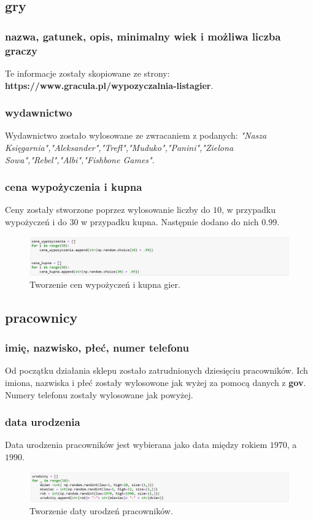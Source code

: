\documentclass[12pt, letterpaper]{article}
\begin{document}
\subsection{gry}

\subsubsection{nazwa, gatunek, opis, minimalny wiek i możliwa liczba graczy}

Te informacje zostały skopiowane ze strony:
\textbf{https://www.gracula.pl/wypozyczalnia-listagier}.

\subsubsection{wydawnictwo}
Wydawnictwo zostało wylosowane ze zwracaniem z podanych:
\textit{"Nasza Księgarnia","Aleksander","Trefl","Muduko","Panini","Zielona Sowa","Rebel","Albi","Fishbone Games"}.

\subsubsection{cena wypożyczenia i kupna}
Ceny zostały stworzone poprzez wylosowanie liczby do $10$, w przypadku wypożyczeń i do $30$ w przypadku kupna. Następnie dodano do nich $0.99$.
\begin{figure}[h!]
	\centering
	\includegraphics[width=1.0\textwidth]{3.png}
	\caption{Tworzenie cen wypożyczeń i kupna gier.}
\end{figure}


\subsection{pracownicy}
\subsubsection{imię, nazwisko, płeć, numer telefonu}
Od początku działania sklepu zostało zatrudnionych dziesięciu pracowników. Ich imiona, nazwiska i płeć zostały wylosowone jak wyżej za pomocą danych z \textbf{gov}. Numery telefonu zostały wylosowane jak powyżej.
\subsubsection{data urodzenia}
Data urodzenia pracowników jest wybierana jako data między rokiem $1970$, a $1990$.
\begin{figure}[h!]
	\centering
	\includegraphics[width=1.0\textwidth]{4.png}
	\caption{Tworzenie daty urodzeń pracowników.}
\end{figure}
\end{document}
